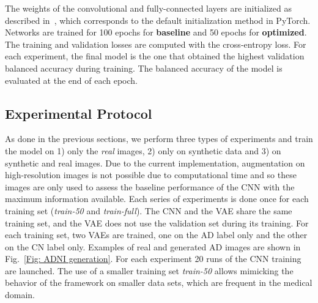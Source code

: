 \documentclass[10pt,journal,compsoc]{IEEEtran}
\begin{document}
The weights of the convolutional and fully-connected layers are initialized as described in~\cite{he_delving_2015}, which corresponds to the default initialization method in PyTorch. Networks are trained for 100 epochs for \textbf{baseline} and 50 epochs for \textbf{optimized}. The training and validation losses are computed with the cross-entropy loss. For each experiment, the final model is the one that obtained the highest validation balanced accuracy during training. The balanced accuracy of the model is evaluated at the end of each epoch.

\subsection{Experimental Protocol}

As done in the previous sections, we perform three types of experiments and train the model on 1) only the \emph{real} images, 2) only on synthetic data and 3) on synthetic and real images. Due to the current implementation, augmentation on high-resolution images is not possible due to computational time and so these images are only used to assess the baseline performance of the CNN with the maximum information available. Each series of experiments is done once for each training set (\textit{train-50} and \textit{train-full}). The CNN and the VAE share the same training set, and the VAE does not use the validation set during its training. For each training set, two VAEs are trained, one on the AD label only and the other on the CN label only. Examples of real and generated AD images are shown in Fig.~\ref{Fig: ADNI generation}. For each experiment 20 runs of the CNN training are launched. The use of a smaller training set \textit{train-50} allows mimicking the behavior of the framework on smaller data sets, which are frequent in the medical domain.
\end{document}
